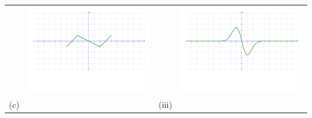 \documentclass[12pt]{article}
\begin{document}
\begin{enumerate}
\begin{center}
\begin{tabular}{cc|cc}
&\includegraphics[scale=0.218]{match2.pdf} & &\includegraphics[scale=0.218]{matchc.pdf}\\
(c) && (iii)&\\

\end{tabular}
\end{center}
\end{enumerate}
\end{document}
